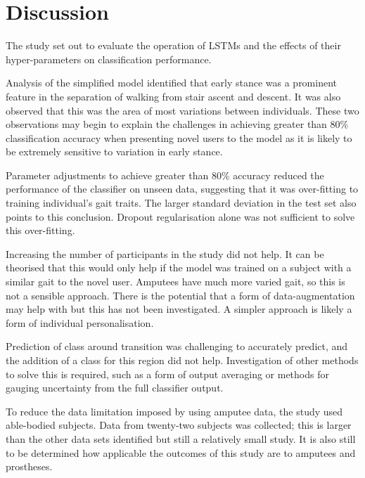 \documentclass[sensors,article,submit,moreauthors,pdftex]{Definitions/mdpi}
\begin{document}
\section{Discussion}
\label{sec:discussion}
The study set out to evaluate the operation of LSTMs and the effects of their hyper-parameters on classification performance.

Analysis of the simplified model identified that early stance was a prominent feature in the separation of walking from stair ascent and descent. It was also observed that this was the area of most variations between individuals. These two observations may begin to explain the challenges in achieving greater than 80\% classification accuracy when presenting novel users to the model as it is likely to be extremely sensitive to variation in early stance.  

Parameter adjustments to achieve greater than 80\% accuracy reduced the performance of the classifier on unseen data, suggesting that it was over-fitting to training individual's gait traits. The larger standard deviation in the test set also points to this conclusion. Dropout regularisation alone was not sufficient to solve this over-fitting.

Increasing the number of participants in the study did not help. It can be theorised that this would only help if the model was trained on a subject with a similar gait to the novel user. Amputees have much more varied gait, so this is not a sensible approach. There is the potential that a form of data-augmentation may help with but this has not been investigated. A simpler approach is likely a form of individual personalisation.

Prediction of class around transition was challenging to accurately predict, and the addition of a class for this region did not help. Investigation of other methods to solve this is required, such as a form of output averaging or methods for gauging uncertainty from the full classifier output.

To reduce the data limitation imposed by using amputee data, the study used able-bodied subjects. Data from twenty-two subjects was collected; this is larger than the other data sets identified but still a relatively small study. It is also still to be determined how applicable the outcomes of this study are to amputees and prostheses.

\end{document}
